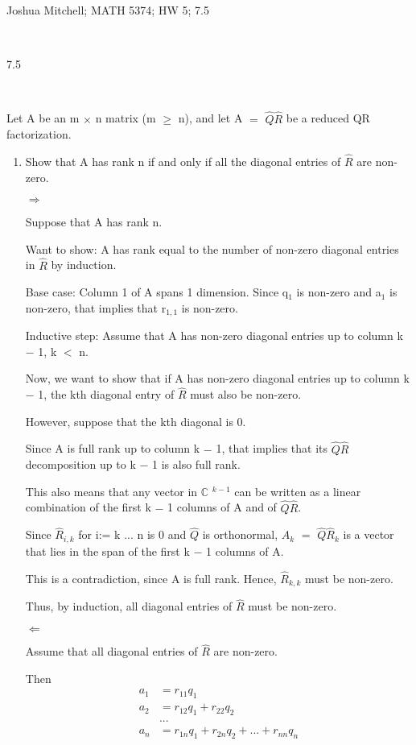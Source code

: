 \documentclass[12pt]{article}
\newcommand{\mt}[1]{\ensuremath{#1}}
\newcommand{\bc}{\mt{\mathbb{C}} }       %
\newcommand{\rar}{ \mt{\Rightarrow} }     %
\newcommand{\lar}{ \mt{\Leftarrow} }      %
\newcommand{\ms}{\mt{-} }
\newcommand{\ls}{\mt{<} }
\newcommand{\gre}{\mt{\geq} }
\newcommand{\eql}{\mt{=} }
\newcommand{\uw}[2]{#1\mt{_{#2}}}
\newcommand{\uf}[2]{#1\mt{^{#2}}}
\newcommand{\splt}[1]{\begin{split}#1\end{split}}
\begin{document}
Joshua Mitchell; MATH 5374; HW 5; 7.5 

\

7.5

\

Let A be an m $\times$ n matrix (m \gre n), and let A \eql $\hat Q \hat R$ be a reduced QR factorization.

\begin{enumerate}
  \item Show that A has rank n if and only if all the diagonal entries of $\hat R$ are non-zero.
  
 \rar
 
 Suppose that A has rank n.
 
 Want to show: A has rank equal to the number of non-zero diagonal entries in $\hat R$ by induction.
 
 Base case: Column 1 of A spans 1 dimension. Since \uw{q}{1} is non-zero and \uw{a}{1} is non-zero, that implies that \uw{r}{1, 1} is non-zero.
 
 Inductive step: Assume that A has non-zero diagonal entries up to column k \ms 1, k \ls n.
 
 Now, we want to show that if A has non-zero diagonal entries up to column k \ms 1, the kth diagonal entry of $\hat R$ must also be non-zero.
 
 However, suppose that the kth diagonal is 0. 
 
 Since A is full rank up to column k \ms 1, that implies that its $\hat Q \hat R$ decomposition up to k \ms 1 is also full rank.
 
 This also means that any vector in \uf{\bc}{k \ms 1} can be written as a linear combination of the first k \ms 1 columns of A and of $\hat Q \hat R$.
 
 Since $\hat R_{i, k}$ for i:= k ... n is 0 and $\hat Q$ is orthonormal, $A_k$ \eql $\hat Q \hat R_k$ is a vector that lies in the span of the first k \ms 1 columns of A.
 
 This is a contradiction, since A is full rank. Hence, $\hat R_{k, k}$ must be non-zero.
 
 Thus, by induction, all diagonal entries of $\hat R$ must be non-zero.
 
 \newpage
 
 \lar
 
 Assume that all diagonal entries of $\hat R$ are non-zero.
 
 Then
 \begin{displaymath}
  \splt{a_1 & = r_{11}q_1 \\
  a_2 & = r_{12}q_1 + r_{22}q_2 \\
  & ... \\
  a_n & = r_{1n}q_1 + r_{2n}q_2 + ... + r_{nn}q_n
  }
\end{displaymath}


\end{enumerate}
\end{document}

